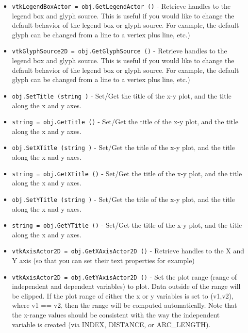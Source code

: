 \begin{itemize}
\item  \verb|vtkLegendBoxActor = obj.GetLegendActor ()| -  Retrieve handles to the legend box and glyph source. This is useful
 if you would like to change the default behavior of the legend box
 or glyph source. For example, the default glyph can be changed from
 a line to a vertex plus line, etc.)

\item  \verb|vtkGlyphSource2D = obj.GetGlyphSource ()| -  Retrieve handles to the legend box and glyph source. This is useful
 if you would like to change the default behavior of the legend box
 or glyph source. For example, the default glyph can be changed from
 a line to a vertex plus line, etc.)

\item  \verb|obj.SetTitle (string )| -  Set/Get the title of the x-y plot, and the title along the 
 x and y axes.

\item  \verb|string = obj.GetTitle ()| -  Set/Get the title of the x-y plot, and the title along the 
 x and y axes.

\item  \verb|obj.SetXTitle (string )| -  Set/Get the title of the x-y plot, and the title along the 
 x and y axes.

\item  \verb|string = obj.GetXTitle ()| -  Set/Get the title of the x-y plot, and the title along the 
 x and y axes.

\item  \verb|obj.SetYTitle (string )| -  Set/Get the title of the x-y plot, and the title along the 
 x and y axes.

\item  \verb|string = obj.GetYTitle ()| -  Set/Get the title of the x-y plot, and the title along the 
 x and y axes.

\item  \verb|vtkAxisActor2D = obj.GetXAxisActor2D ()| -  Retrieve handles to the X and Y axis (so that you can set their text
 properties for example)

\item  \verb|vtkAxisActor2D = obj.GetYAxisActor2D ()| -  Set the plot range (range of independent and dependent variables)
 to plot. Data outside of the range will be clipped. If the plot
 range of either the x or y variables is set to (v1,v2), where
 v1 == v2, then the range will be computed automatically. Note that
 the x-range values should be consistent with the way the independent
 variable is created (via INDEX, DISTANCE, or ARC\_LENGTH).


\end{itemize}
